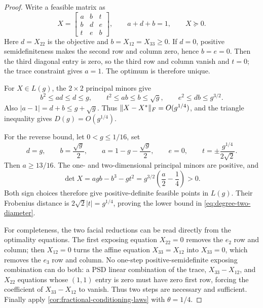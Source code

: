 \begin{proof}
Write a feasible matrix as
\[
 X=\begin{bmatrix}
      a&b&t\\ b&d&e\\ t&e&b
    \end{bmatrix},
 \qquad a+d+b=1,\qquad X\succeq0.
\]
Here $d=X_{22}$ is the objective and $b=X_{12}=X_{33}\geq0$.  If $d=0$,
positive semidefiniteness makes the second row and column zero, hence $b=e=0$.
Then the third diagonal entry is zero, so the third row and column vanish and
$t=0$; the trace constraint gives $a=1$.  The optimum is therefore unique.

For $X\in L(g)$, the $2\times2$ principal minors give
\[
 b^2\leq ad\leq d\leq g,
 \qquad
 t^2\leq ab\leq b\leq\sqrt g,
 \qquad
 e^2\leq db\leq g^{3/2}.
\]
Also $|a-1|=d+b\leq g+\sqrt g$.  Thus
$\lVert X-X^*\rVert_F=O(g^{1/4})$, and the triangle inequality gives
$D(g)=O(g^{1/4})$.

For the reverse bound, let $0<g\leq1/16$, set
\[
 d=g,\qquad b=\frac{\sqrt g}{2},\qquad
 a=1-g-\frac{\sqrt g}{2},\qquad e=0,\qquad
 t=\pm\frac{g^{1/4}}{2\sqrt2}.
\]
Then $a\geq13/16$.  The one- and two-dimensional principal minors are
positive, and
\[
 \det X
 =ag b-b^3-gt^2
 =g^{3/2}\left(\frac a2-\frac14\right)>0.
\]
Both sign choices therefore give positive-definite feasible points in
$L(g)$.  Their Frobenius distance is
$2\sqrt2|t|=g^{1/4}$, proving the lower bound in
\eqref{eq:degree-two-diameter}.

For completeness, the two facial reductions can be read directly from the
optimality equations.  The first exposing equation $X_{22}=0$ removes the
$e_2$ row and column; then $X_{12}=0$ turns the affine equation
$X_{33}=X_{12}$ into $X_{33}=0$, which removes the $e_3$ row and column.
No one-step positive-semidefinite exposing combination can do both: a PSD
linear combination of the trace, $X_{33}-X_{12}$, and $X_{22}$ equations
whose $(1,1)$ entry is zero must have zero first row, forcing the coefficient
of $X_{33}-X_{12}$ to vanish.  Thus two steps are necessary and sufficient.
Finally apply \cref{cor:fractional-conditioning-laws} with $\theta=1/4$.
\end{proof}


